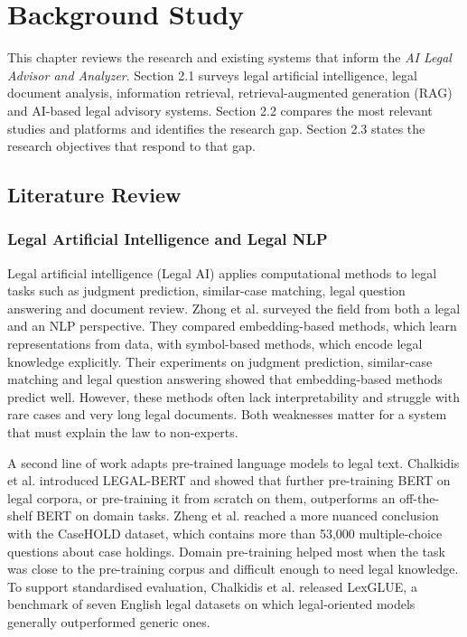 \chapter{Background Study}\label{ch:2}

This chapter reviews the research and existing systems that inform the \emph{AI Legal Advisor and Analyzer}. Section 2.1 surveys legal artificial intelligence, legal document analysis, information retrieval, retrieval-augmented generation (RAG) and AI-based legal advisory systems. Section 2.2 compares the most relevant studies and platforms and identifies the research gap. Section 2.3 states the research objectives that respond to that gap.

\section{Literature Review}

\subsection{Legal Artificial Intelligence and Legal NLP}

Legal artificial intelligence (Legal AI) applies computational methods to legal tasks such as judgment prediction, similar-case matching, legal question answering and document review. Zhong et al. \cite{r1} surveyed the field from both a legal and an NLP perspective. They compared embedding-based methods, which learn representations from data, with symbol-based methods, which encode legal knowledge explicitly. Their experiments on judgment prediction, similar-case matching and legal question answering showed that embedding-based methods predict well. However, these methods often lack interpretability and struggle with rare cases and very long legal documents. Both weaknesses matter for a system that must explain the law to non-experts.

A second line of work adapts pre-trained language models to legal text. Chalkidis et al. \cite{r2} introduced LEGAL-BERT and showed that further pre-training BERT on legal corpora, or pre-training it from scratch on them, outperforms an off-the-shelf BERT on domain tasks. Zheng et al. \cite{r3} reached a more nuanced conclusion with the CaseHOLD dataset, which contains more than 53,000 multiple-choice questions about case holdings. Domain pre-training helped most when the task was close to the pre-training corpus and difficult enough to need legal knowledge. To support standardised evaluation, Chalkidis et al. \cite{r4} released LexGLUE, a benchmark of seven English legal datasets on which legal-oriented models generally outperformed generic ones.

